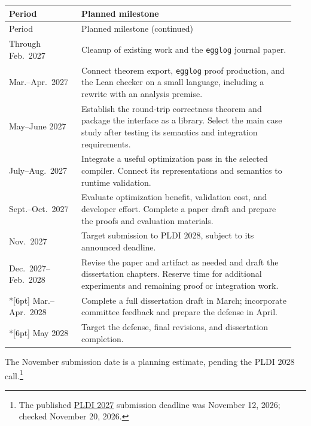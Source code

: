   \begin{longtable}{@{}p{0.24\linewidth}p{0.71\linewidth}@{}}
    \toprule
    Period & Planned milestone \\
    \midrule
    \endfirsthead
    \toprule
    Period & Planned milestone (continued) \\
    \midrule
    \endhead
    Through Feb.\ 2027 &
    Cleanup of existing work and the \texttt{egglog} journal paper. \\[6pt]
    Mar.--Apr.\ 2027 &
    Connect theorem export, \texttt{egglog} proof production, and the Lean checker
      on a small language, including a rewrite with an analysis premise. \\[6pt]
    May--June 2027 &
    Establish the round-trip correctness theorem and package the interface as a library.
    Select the main case study after testing its semantics and integration requirements. \\[6pt]
    July--Aug.\ 2027 &
    Integrate a useful optimization pass in the selected compiler.
    Connect its representations and semantics to runtime validation. \\[6pt]
    Sept.--Oct.\ 2027 &
    Evaluate optimization benefit, validation cost, and developer effort.
    Complete a paper draft and prepare the proofs and evaluation materials. \\[6pt]
    Nov.\ 2027 &
    Target submission to PLDI 2028, subject to its announced deadline. \\[6pt]
    Dec.\ 2027--Feb.\ 2028 &
    Revise the paper and artifact as needed and draft the dissertation chapters.
    Reserve time for additional experiments and remaining proof or integration work. \\*[6pt]
    Mar.--Apr.\ 2028 &
    Complete a full dissertation draft in March;
      incorporate committee feedback and prepare the defense in April. \\*[6pt]
    May 2028 &
    Target the defense, final revisions, and dissertation completion. \\
    \bottomrule
  \end{longtable}

The November submission date is a planning estimate, pending the PLDI 2028 call.\footnote{The published
  \href{https://pldi27.sigplan.org/track/pldi-2027-papers}{PLDI 2027} submission deadline
  was November 12, 2026; checked November 20, 2026.}
